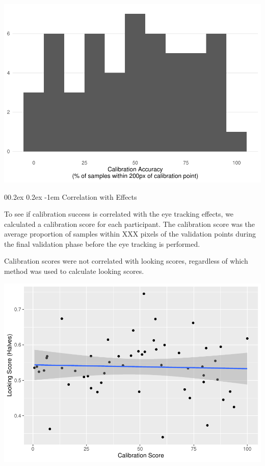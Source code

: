 \documentclass[
  man,floatsintext]{apa6}
\makeatletter
\let\oldparagraph\paragraph
\renewcommand{\paragraph}[1]{\oldparagraph{#1}\mbox{}}
\renewcommand{\paragraph}{\@startsection{paragraph}{4}{\parindent}%
  {0\baselineskip \@plus 0.2ex \@minus 0.2ex}%
  {-1em}%
  {\normalfont\normalsize\bfseries\itshape\typesectitle}}
\makeatother
\begin{document}
\includegraphics{manuscript_files/figure-latex/E3-cal Plot Calibration Accuracy-1.pdf}

\hypertarget{correlation-with-effects}{%
\paragraph{Correlation with Effects}\label{correlation-with-effects}}

To see if calibration success is correlated with the eye tracking effects, we calculated a calibration score for each participant. The calibration score was the average proportion of samples within XXX pixels of the validation points during the final validation phase before the eye tracking is performed.

Calibration scores were not correlated with looking scores, regardless of which method was used to calculate looking scores.

\includegraphics{manuscript_files/figure-latex/E3-cal Plot looking score (halves) by calibration-1.pdf}
\end{document}
